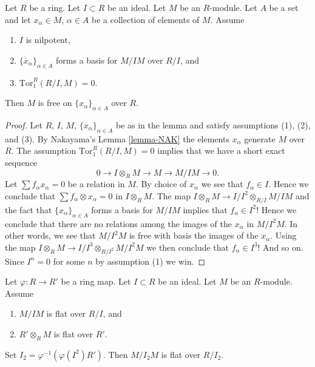 \begin{lemma}
\label{lemma-lift-basis}
Let $R$ be a ring.
Let $I \subset R$ be an ideal.
Let $M$ be an $R$-module.
Let $A$ be a set and let $x_\alpha \in M$, $\alpha \in A$ be a collection
of elements of $M$.
Assume
\begin{enumerate}
\item $I$ is nilpotent,
\item $\{\overline{x}_\alpha\}_{\alpha \in A}$ forms a basis for $M/IM$ over
$R/I$, and
\item $\text{Tor}_1^R(R/I, M) = 0$.
\end{enumerate}
Then $M$ is free on $\{x_\alpha\}_{\alpha \in A}$ over $R$.
\end{lemma}

\begin{proof}
Let $R$, $I$, $M$, $\{x_\alpha\}_{\alpha \in A}$ be as in the lemma
and satisfy assumptions (1), (2), and (3). By
Nakayama's Lemma \ref{lemma-NAK}
the elements $x_\alpha$ generate $M$ over $R$.
The assumption $\text{Tor}_1^R(R/I, M) = 0$ implies that we have a short
exact sequence
$$
0 \to I \otimes_R M \to M \to M/IM \to 0.
$$
Let $\sum f_\alpha x_\alpha = 0$ be a relation in $M$.
By choice of $x_\alpha$ we see that $f_\alpha \in I$.
Hence we conclude that $\sum f_\alpha \otimes x_\alpha = 0$ in
$I \otimes_R M$. The map $I \otimes_R M \to I/I^2 \otimes_{R/I} M/IM$
and the fact that $\{x_\alpha\}_{\alpha \in A}$ forms a basis
for $M/IM$ implies that $f_\alpha \in I^2$! Hence we conclude that
there are no relations among the images of the $x_\alpha$ in
$M/I^2M$. In other words, we see that $M/I^2M$ is free with basis
the images of the $x_\alpha$. Using the map
$I \otimes_R M \to I/I^3 \otimes_{R/I^2} M/I^2M$
we then conclude that $f_\alpha \in I^3$!
And so on. Since $I^n = 0$ for some $n$ by assumption (1) we win.
\end{proof}

\begin{lemma}
\label{lemma-prepare-lift-flatness}
Let $\varphi : R \to R'$ be a ring map.
Let $I \subset R$ be an ideal.
Let $M$ be an $R$-module.
Assume
\begin{enumerate}
\item $M/IM$ is flat over $R/I$, and
\item $R' \otimes_R M$ is flat over $R'$.
\end{enumerate}
Set $I_2 = \varphi^{-1}(\varphi(I^2)R')$.
Then $M/I_2M$ is flat over $R/I_2$.
\end{lemma}


